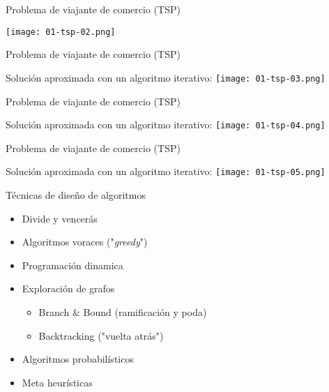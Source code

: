 \begin{frame}[c]{Problema de viajante de comercio (TSP)}
  \begin{center}
    \texttt{[image: 01-tsp-02.png]}
  \end{center}
\end{frame}

\begin{frame}[c]{Problema de viajante de comercio (TSP)}
  \begin{center}
    Solución aproximada con un algoritmo iterativo:
    \vspace{\baselineskip}
    \texttt{[image: 01-tsp-03.png]}
  \end{center}
\end{frame}

\begin{frame}[c]{Problema de viajante de comercio (TSP)}
  \begin{center}
    Solución aproximada con un algoritmo iterativo:
    \vspace{\baselineskip}
    \texttt{[image: 01-tsp-04.png]}
  \end{center}
\end{frame}

\begin{frame}[c]{Problema de viajante de comercio (TSP)}
  \begin{center}
    Solución aproximada con un algoritmo iterativo:
    \vspace{\baselineskip}
    \texttt{[image: 01-tsp-05.png]}
  \end{center}
\end{frame}

\begin{frame}[c]{Técnicas de diseño de algoritmos}
  \begin{itemize}
    \item Divide y vencerás
    \item Algoritmos voraces ("\textit{greedy}")
    \item Programación dinamica
    \item Exploración de grafos
      \begin{itemize}
        \item Branch \& Bound (ramificación y poda)
        \item Backtracking ("vuelta atrás")
      \end{itemize}
    \item Algoritmos probabilísticos
    \item Meta heurísticas
  \end{itemize}
\end{frame}

